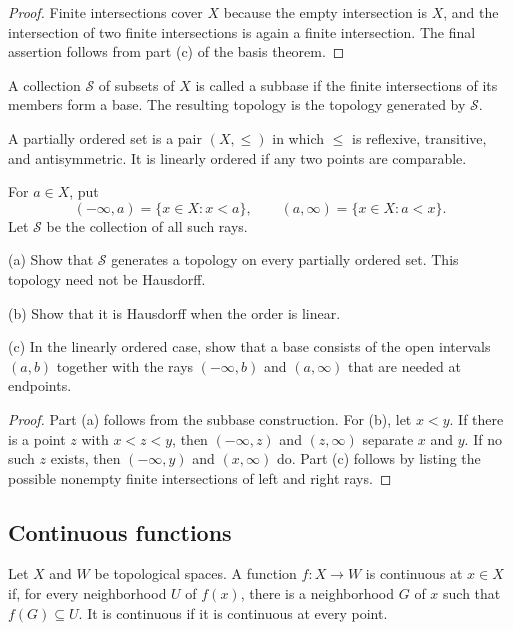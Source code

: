 \begin{proof}
Finite intersections cover $X$ because the empty intersection is $X$, and
the intersection of two finite intersections is again a finite intersection.
The final assertion follows from part (c) of the basis theorem.
\end{proof}

\begin{de}
A collection $\mathcal{S}$ of subsets of $X$ is called a subbase if the finite
intersections of its members form a base. The resulting topology is the
topology generated by $\mathcal{S}$.
\end{de}

\begin{ex}
A partially ordered set is a pair $(X,\leq)$ in which $\leq$ is reflexive,
transitive, and antisymmetric. It is linearly ordered if any two points are
comparable.

For $a\in X$, put
\[
(-\infty,a)=\{x\in X:x<a\},\qquad
(a,\infty)=\{x\in X:a<x\}.
\]
Let $\mathcal{S}$ be the collection of all such rays.

(a) Show that $\mathcal{S}$ generates a topology on every partially ordered
set. This topology need not be Hausdorff.

(b) Show that it is Hausdorff when the order is linear.

(c) In the linearly ordered case, show that a base consists of the open
intervals $(a,b)$ together with the rays $(-\infty,b)$ and $(a,\infty)$ that
are needed at endpoints.
\end{ex}

\begin{proof}
Part (a) follows from the subbase construction. For (b), let $x<y$. If there
is a point $z$ with $x<z<y$, then $(-\infty,z)$ and $(z,\infty)$ separate
$x$ and $y$. If no such $z$ exists, then $(-\infty,y)$ and $(x,\infty)$ do.
Part (c) follows by listing the possible nonempty finite intersections of
left and right rays.
\end{proof}

\subsection{Continuous functions}

\begin{de}
Let $X$ and $W$ be topological spaces. A function $f:X\to W$ is continuous
at $x\in X$ if, for every neighborhood $U$ of $f(x)$, there is a neighborhood
$G$ of $x$ such that $f(G)\subseteq U$. It is continuous if it is continuous
at every point.
\end{de}

